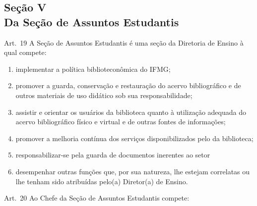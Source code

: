 \documentclass[a4paper,12pt]{report}
\begin{document}

\subsection{Seção V \\ Da Seção de Assuntos Estudantis}

Art.~19 A Seção de Assuntos Estudantis é uma seção da Diretoria de Ensino à qual compete:

\begin{enumerate}
\renewcommand{\labelenumi}{\Roman{enumi}}

\item implementar a política biblioteconômica do IFMG;

\item promover a guarda, conservação e restauração do acervo bibliográfico e de outros 
      materiais de uso didático sob sua responsabilidade;

\item assistir e orientar os usuários da biblioteca quanto à utilização adequada do acervo 
      bibliográfico físico e virtual e de outras fontes de informações;

\item promover a melhoria contínua dos serviços disponibilizados pelo da biblioteca;

\item responsabilizar-se pela guarda de documentos inerentes ao setor

\item desempenhar outras funções que, por sua natureza, lhe estejam correlatas ou lhe 
      tenham sido atribuídas pelo(a) Diretor(a) de Ensino.
\end{enumerate}


Art.~20 Ao Chefe da Seção de Assuntos Estudantis compete:
\end{document}
